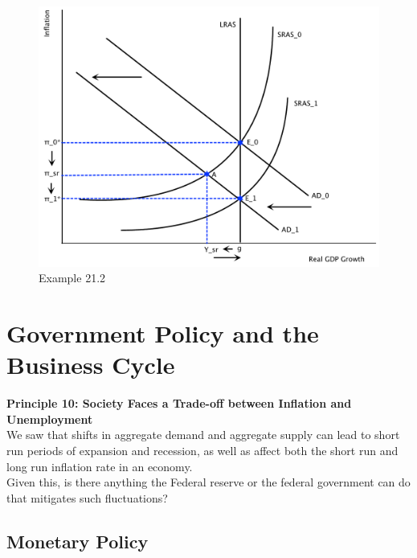 \documentclass[11pt]{article}\usepackage[]{graphicx}\usepackage[]{color}
\theoremstyle{definition}
\begin{document}
\begin{figure}[H]
	\centering
	\includegraphics[scale=.40]{plot101.pdf}
	\caption{Example 21.2}
\end{figure}

\newpage

\section{Government Policy and the Business Cycle}

\textbf{Principle 10: Society Faces a Trade-off between Inflation and Unemployment}
\\

We saw that shifts in aggregate demand and aggregate supply can lead to short run periods of expansion and recession, as well as affect both the short run and long run inflation rate in an economy.
\\

Given this, is there anything the Federal reserve or the federal government can do that mitigates such fluctuations?

\subsection{Monetary Policy}
\end{document}
